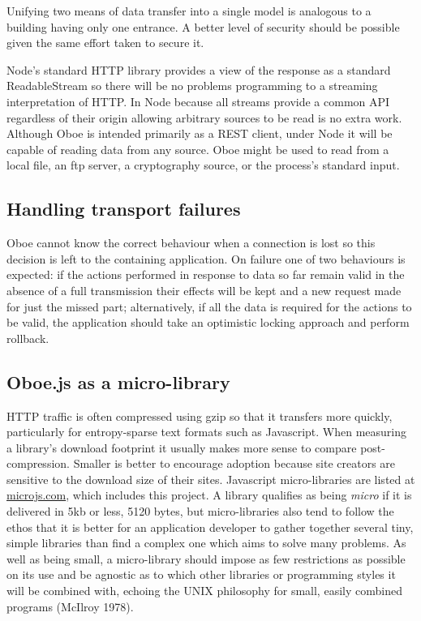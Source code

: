 \documentclass[12pt, ]{article}
\begin{document}
Unifying two means of data transfer into a single model is analogous to
a building having only one entrance. A better level of security should
be possible given the same effort taken to secure it.

Node's standard HTTP library provides a view of the response as a
standard ReadableStream so there will be no problems programming to a
streaming interpretation of HTTP. In Node because all streams provide a
common API regardless of their origin allowing arbitrary sources to be
read is no extra work. Although Oboe is intended primarily as a REST
client, under Node it will be capable of reading data from any source.
Oboe might be used to read from a local file, an ftp server, a
cryptography source, or the process's standard input.

\subsection{Handling transport
failures}\label{handling-transport-failures}

Oboe cannot know the correct behaviour when a connection is lost so this
decision is left to the containing application. On failure one of two
behaviours is expected: if the actions performed in response to data so
far remain valid in the absence of a full transmission their effects
will be kept and a new request made for just the missed part;
alternatively, if all the data is required for the actions to be valid,
the application should take an optimistic locking approach and perform
rollback.

\subsection{Oboe.js as a
micro-library}\label{oboe.js-as-a-micro-library}

HTTP traffic is often compressed using gzip so that it transfers more
quickly, particularly for entropy-sparse text formats such as
Javascript. When measuring a library's download footprint it usually
makes more sense to compare post-compression. Smaller is better to
encourage adoption because site creators are sensitive to the download
size of their sites. Javascript micro-libraries are listed at
\href{http://microjs.com}{microjs.com}, which includes this project. A
library qualifies as being \emph{micro} if it is delivered in 5kb or
less, 5120 bytes, but micro-libraries also tend to follow the ethos that
it is better for an application developer to gather together several
tiny, simple libraries than find a complex one which aims to solve many
problems. As well as being small, a micro-library should impose as few
restrictions as possible on its use and be agnostic as to which other
libraries or programming styles it will be combined with, echoing the
UNIX philosophy for small, easily combined programs (McIlroy 1978).
\end{document}
